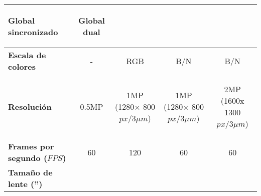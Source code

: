 \begin{itemize}
\begin{savenotes}
\begin{mytable}[H]
\begin{tabular}{l|c|c|c|c|}
			\begin{minipage}{\mythirdmaxsizeofcontenttable}\begin{myflushcenter}
				Global sincronizado 
			\end{myflushcenter}\end{minipage}&
			\begin{minipage}{\mythirdmaxsizeofcontenttable}\begin{myflushcenter}
				Global dual 
			\end{myflushcenter}\end{minipage} \\ \hline
			\multicolumn{1}{|l|}{
				\begin{minipage}{\myforthmaxsizeofcontenttable}	
					\textbf{Escala de colores}
				\end{minipage}
			} & - & RGB & B/N & B/N \\ \hline
			\multicolumn{1}{|l|}{
				\begin{minipage}{\myforthmaxsizeofcontenttable}	
					\textbf{Resolución}
				\end{minipage}
			} & 0.5MP & 
			\begin{minipage}{\mythirdmaxsizeofcontenttable}\begin{myflushcenter}
					1MP (1280× 800 $px/3{\mu}m$)
			\end{myflushcenter}\end{minipage} & 
			\begin{minipage}{\mythirdmaxsizeofcontenttable}\begin{myflushcenter}
					1MP (1280× 800 $px/3{\mu}m$)
			\end{myflushcenter}\end{minipage} & 
			\begin{minipage}{\mythirdmaxsizeofcontenttable}\begin{myflushcenter}
					2MP (1600x 1300 $px/3{\mu}m$)
			\end{myflushcenter}\end{minipage} \\ \hline
			\multicolumn{1}{|l|}{
				\begin{minipage}{\myforthmaxsizeofcontenttable}	
					\textbf{Frames por segundo ($FPS$)}
				\end{minipage}
			} & 60 %
			& 120 & 60 & 60 \\ \hline
			\multicolumn{1}{|l|}{
				\begin{minipage}{\myforthmaxsizeofcontenttable}	
					\textbf{Tamaño de lente ('')}
				\end{minipage}
}
\end{tabular}
\end{mytable}
\end{savenotes}
\end{itemize}
